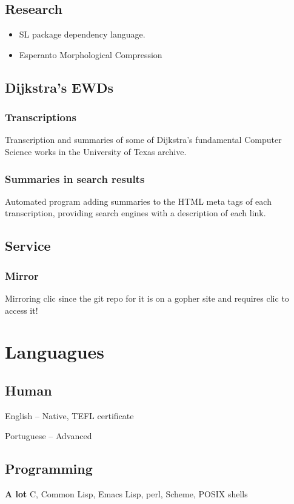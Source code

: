 \subsection{Research}
\begin{itemize}[\\]
    \item{SL package dependency language.}
    \item{Esperanto Morphological Compression}
\end{itemize}

\subsection{Dijkstra's EWDs}
\subsubsection{Transcriptions}
Transcription and summaries of some of Dijkstra's fundamental Computer Science works in the University of Texas archive.
\subsubsection{Summaries in search results}
Automated program adding summaries to the HTML meta tags of each transcription, providing search engines with a description of each link.
\subsection{Service}
\subsubsection{Mirror} Mirroring clic since the git repo for it is on a gopher site and requires clic to access it!

\section{Languagues}
\subsection{Human}
English -- Native, TEFL certificate

Portuguese -- Advanced
\subsection{Programming}
{\bfseries A lot} C, Common Lisp, Emacs Lisp, perl, Scheme, POSIX shells

